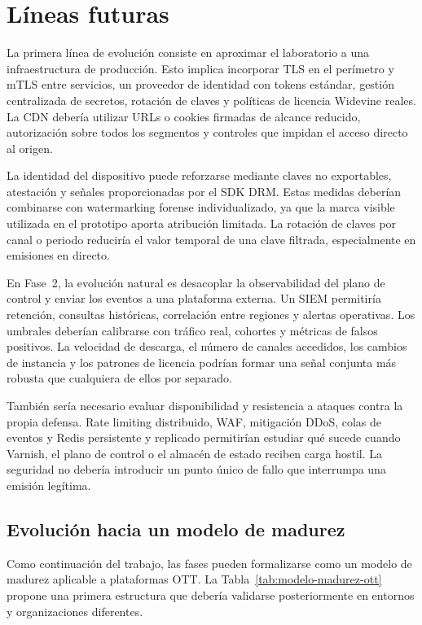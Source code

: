 \section{Líneas futuras}

La primera línea de evolución consiste en aproximar el laboratorio a una infraestructura de producción. Esto implica incorporar TLS en el perímetro y mTLS entre servicios, un proveedor de identidad con tokens estándar, gestión centralizada de secretos, rotación de claves y políticas de licencia Widevine reales. La CDN debería utilizar URLs o cookies firmadas de alcance reducido, autorización sobre todos los segmentos y controles que impidan el acceso directo al origen.

La identidad del dispositivo puede reforzarse mediante claves no exportables, atestación y señales proporcionadas por el SDK DRM. Estas medidas deberían combinarse con watermarking forense individualizado, ya que la marca visible utilizada en el prototipo aporta atribución limitada. La rotación de claves por canal o periodo reduciría el valor temporal de una clave filtrada, especialmente en emisiones en directo.

En Fase~2, la evolución natural es desacoplar la observabilidad del plano de control y enviar los eventos a una plataforma externa. Un SIEM permitiría retención, consultas históricas, correlación entre regiones y alertas operativas. Los umbrales deberían calibrarse con tráfico real, cohortes y métricas de falsos positivos. La velocidad de descarga, el número de canales accedidos, los cambios de instancia y los patrones de licencia podrían formar una señal conjunta más robusta que cualquiera de ellos por separado.

También sería necesario evaluar disponibilidad y resistencia a ataques contra la propia defensa. Rate limiting distribuido, WAF, mitigación DDoS, colas de eventos y Redis persistente y replicado permitirían estudiar qué sucede cuando Varnish, el plano de control o el almacén de estado reciben carga hostil. La seguridad no debería introducir un punto único de fallo que interrumpa una emisión legítima.

\subsection{Evolución hacia un modelo de madurez}

Como continuación del trabajo, las fases pueden formalizarse como un modelo de madurez aplicable a plataformas OTT. La Tabla~\ref{tab:modelo-madurez-ott} propone una primera estructura que debería validarse posteriormente en entornos y organizaciones diferentes.

